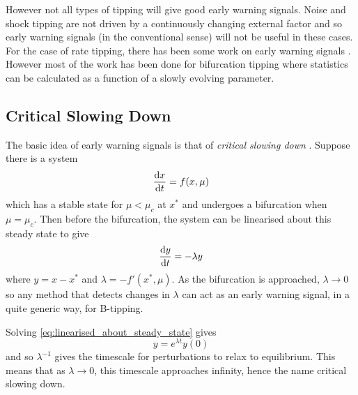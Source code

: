 However not all types of tipping will give good early warning signals. Noise and shock tipping are not driven by a continuously changing external factor and
so early warning signals (in the conventional sense) will not be useful in these cases. For the case of rate tipping, there has been some work on
early warning signals \parencite{Ritchie2016}. However most of the work has been done
for bifurcation tipping where statistics can be calculated as a function of a slowly evolving parameter.

\subsection{Critical Slowing Down}
The basic idea of early warning signals is that of \emph{critical slowing down} \parencite{Dakos2008}. Suppose there is a system
\begin{equation}
  \label{eq:system}
  \dv{x}{t} = f(x,\mu)
\end{equation}
which has a stable state for $\mu < \mu_c$ at $x^*$ and undergoes a bifurcation when $\mu=\mu_c$. Then before the bifurcation, the system can be linearised about this steady state
to give
\begin{equation}
  \label{eq:linearised_about_steady_state}
  \dv{y}{t} = -\lambda y
\end{equation}
where $y = x -x^*$ and $\lambda = -f'(x^*,\mu)$. As the bifurcation is approached, $\lambda \rightarrow 0$ so any method that detects changes in $\lambda$ can act as an early warning
signal, in a quite generic way, for B-tipping.

Solving \cref{eq:linearised_about_steady_state} gives
\begin{equation}
  \label{eq:solved_linaer}
  y = e^{\lambda t} y(0)
\end{equation}
and so $\lambda^{-1}$ gives the timescale for perturbations to relax to equilibrium. This means that as $\lambda \rightarrow 0$,
this timescale approaches infinity, hence the name critical slowing down.


